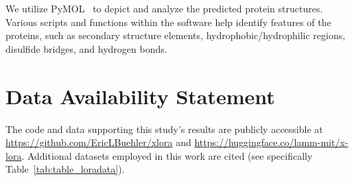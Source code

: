 We utilize PyMOL~\cite{Schrodinger2015The1.8} to depict and analyze the predicted protein structures. Various scripts and functions within the software help identify features of the proteins, such as secondary structure elements, hydrophobic/hydrophilic regions, disulfide bridges, and hydrogen bonds.

\section*{Data Availability Statement} The code and data supporting this study's results are publicly accessible at \url{https://github.com/EricLBuehler/xlora} and \url{https://huggingface.co/lamm-mit/x-lora}. Additional datasets employed in this work are cited (see specifically Table~\ref{tab:table_loradata}).

